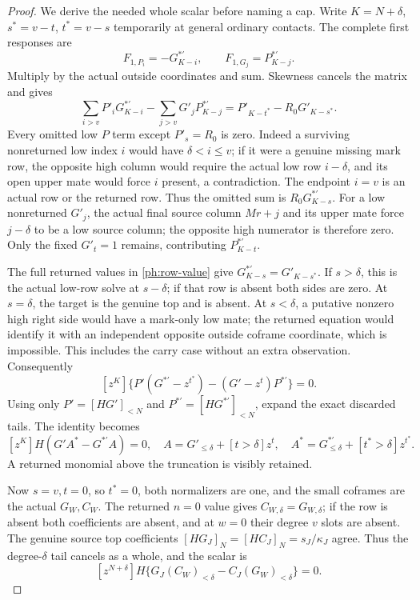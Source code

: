 \documentclass[11pt,a4paper]{amsart}
\numberwithin{equation}{section}
\theoremstyle{plain}
\theoremstyle{definition}
\begin{document}
\begin{proof}
We derive the needed whole scalar before naming a cap.
Write \(K=N+\delta\), \(s^*=v-t\), \(t^*=v-s\) temporarily at general
ordinary contacts.  The complete first responses are
\[
 F_{1,P_i}=-G^{*'}_{K-i},\qquad
 F_{1,G_j}=P^{*'}_{K-j}.
\]
Multiply by the actual outside coordinates and sum.  Skewness cancels
the matrix and gives
\[
 \sum_{i>v}P'_iG^{*'}_{K-i}
  -\sum_{j>v}G'_jP^{*'}_{K-j}
       =P'_{K-t^*}-R_0G'_{K-s^*}.
\]
Every omitted low \(P\) term except \(P'_s=R_0\) is zero.
Indeed a surviving nonreturned low index \(i\) would have
\(\delta<i\le v\); if it were a genuine missing mark row, the opposite
high column would require the actual low row \(i-\delta\), and its
open upper mate would force \(i\) present, a contradiction.
The endpoint \(i=v\) is an actual row or the returned row.
Thus the omitted sum is \(R_0G^{*'}_{K-s}\).
For a low nonreturned \(G'_j\), the actual final source column
\(Mr+j\) and its upper mate force \(j-\delta\) to be a low source
column; the opposite high numerator is therefore zero.
Only the fixed \(G'_t=1\) remains, contributing \(P^{*'}_{K-t}\).

The full returned values in \eqref{ph:row-value} give
\(G^{*'}_{K-s}=G'_{K-s^*}\).
If \(s>\delta\), this is the actual low-row solve at \(s-\delta\);
if that row is absent both sides are zero.
At \(s=\delta\), the target is the genuine top and is absent.
At \(s<\delta\), a putative nonzero high right side would have a
mark-only low mate; the returned equation would identify it with an
independent opposite outside coframe coordinate, which is impossible.
This includes the carry case without an extra observation.
Consequently
\[
 [z^K]\{P'(G^{*'}-z^{t^*})-(G'-z^t)P^{*'}\}=0.
\]
Using only \(P'=[HG']_{<N}\) and
\(P^{*'}=[HG^{*'}]_{<N}\), expand the exact discarded tails.
The identity becomes
\[
 [z^K]H(G'A^*-G^{*'}A)=0,\quad
 A=G'_{\le\delta}+[t>\delta]z^t,\quad
 A^*=G^{*'}_{\le\delta}+[t^*>\delta]z^{t^*}.
\]
A returned monomial above the truncation is visibly retained.

Now \(s=v,t=0\), so \(t^*=0\), both normalizers are one, and the
small coframes are the actual \(G_W,C_W\).
The returned \(n=0\) value gives \(C_{W,\delta}=G_{W,\delta}\);
if the row is absent both coefficients are absent, and at \(w=0\)
their degree \(v\) slots are absent.
The genuine source top coefficients
\([HG_J]_N=[HC_J]_N=s_J/\kappa_J\) agree.
Thus the degree-\(\delta\) tail cancels as a whole, and the scalar is
\begin{equation}\label{ph:endpoint-scalar}
 [z^{N+\delta}]H
   \{G_J(C_W)_{<\delta}-C_J(G_W)_{<\delta}\}=0.
\end{equation}


\end{proof}
\end{document}
